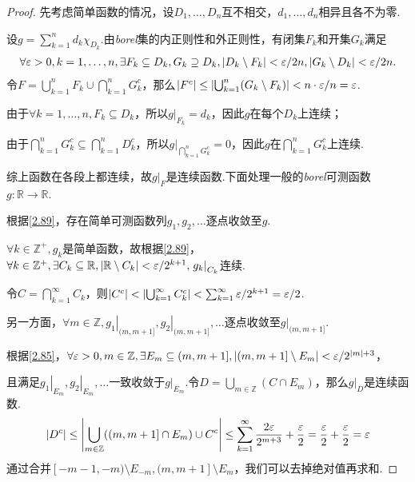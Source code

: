 \begin{proof}
    先考虑简单函数的情况，设\(D_1, \dots, D_n\)互不相交，\(d_1, \dots, d_n\)相异且各不为零.

    设\(g=\sum_{k=1}^n d_k \chi_{D_k}\).由\textit{borel}集的{\kaishu 内正则性}和{\kaishu 外正则性}，有闭集\(F_k\)和开集\(G_k\)满足
    \begin{align*}
        \forall \varepsilon>0, k=1, \dots, n, \exists F_k \subseteq D_k, G_k \supseteq D_k, 
        \abs*{D_k \setminus F_k}<\varepsilon/2n, \abs*{G_k \setminus D_k}<\varepsilon/2n.
    \end{align*}
    令\(F=\bigcup_{k=1}^n F_k \cup \bigcap_{k=1}^n G_k^c\)，那么\(\abs*{F^c} \leq \abs*{\bigcup_{k=1}^n (G_k \setminus F_k)}<n \cdot \varepsilon/n=\varepsilon\).

    由于\(\forall k=1, \dots, n, F_k \subseteq D_k\)，所以\(\left.g\right|_{F_k}=d_k\)，因此\(g\)在每个\(D_k\)上连续；

    由于\(\bigcap_{k=1}^n G_k^c \subseteq \bigcap_{k=1}^n D_k^c\)，所以\(\left.g\right|_{\bigcap_{k=1}^n G_k^c}=0\)，因此\(g\)在\(\bigcap_{k=1}^n G_k^c\)上连续.

    {\kaishu 综上函数在各段上都连续，故\(\left.g\right|_F\)是连续函数.下面处理一般的\textit{borel}可测函数\(g: \mathbb{R} \to \mathbb{R}\).}

    根据\cref{2.89}，存在简单可测函数列\(g_1, g_2, \dots\)逐点收敛至\(g\).

    \(\forall k \in \mathbb{Z}^+, g_k\)是简单函数，故根据\cref{2.89}，\(\forall k \in \mathbb{Z}^+, \exists C_k \subseteq \mathbb{R}, \abs*{\mathbb{R} \setminus C_k}<\varepsilon/2^{k+1}, \left.g_k\right|_{C_k}\)连续.
    
    令\(C=\bigcap_{k=1}^\infty C_k\)，则\(\abs*{C^c}<\abs*{\bigcup_{k=1}^\infty C_k^c}<\sum_{k=1}^\infty \varepsilon/2^{k+1}=\varepsilon/2\).
    
    另一方面，\(\forall m \in \mathbb{Z}, \left.g_1\right|_{(m,m+1]}, \left.g_2\right|_{(m,m+1]}, \dots\)逐点收敛至\(\left.g\right|_{(m,m+1]}\).
    
    根据\cref{2.85}，\(\forall \varepsilon>0, m \in \mathbb{Z}, \exists E_m \subseteq (m,m+1], \abs*{(m,m+1] \setminus E_m}<\varepsilon/2^{\abs*{m}+3}\)，
    
    且满足\(\left.g_1\right|_{E_m}, \left.g_2\right|_{E_m}, \dots\)一致收敛于\(\left.g\right|_{E_m}\).令\(D=\bigcup_{m \in \mathbb{Z}}(C \cap E_m)\)，那么\(\left.g\right|_D\)是连续函数.
    \begin{align*}
        \abs*{D^c} \leq \abs*{\bigcup_{m \in \mathbb{Z}}((m,m+1] \cap E_m) \cup C^c} 
        \leq \sum_{k=1}^\infty \frac{2\varepsilon}{2^{m+3}}+\frac{\varepsilon}{2}=\frac{\varepsilon}{2}+\frac{\varepsilon}{2}=\varepsilon 
    \end{align*}
    {\kaishu 通过合并\([-m-1,-m) \setminus E_{-m},(m,m+1] \setminus E_m\)，我们可以去掉绝对值再求和.}


\end{proof}
